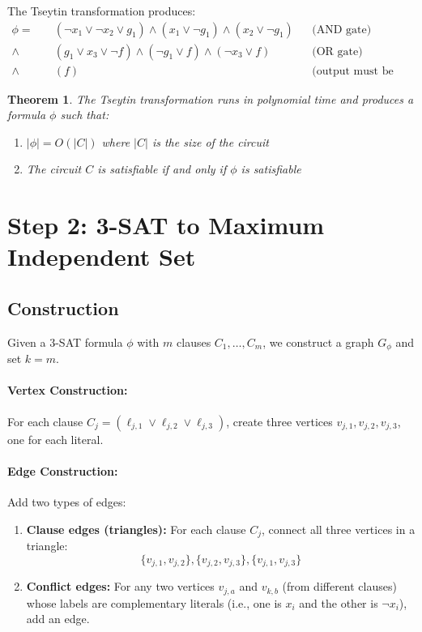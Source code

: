 \documentclass[11pt,a4paper]{article}
\newtheorem{theorem}{Theorem}
\begin{document}
The Tseytin transformation produces:
\begin{align*}
\phi = \quad & (\neg x_1 \lor \neg x_2 \lor g_1) \land (x_1 \lor \neg g_1) \land (x_2 \lor \neg g_1) && \text{(AND gate)} \\
\land\quad & (g_1 \lor x_3 \lor \neg f) \land (\neg g_1 \lor f) \land (\neg x_3 \lor f) && \text{(OR gate)} \\
\land\quad & (f) && \text{(output must be TRUE)}
\end{align*}

\begin{theorem}
The Tseytin transformation runs in polynomial time and produces a formula $\phi$ such that:
\begin{enumerate}
    \item $|\phi| = O(|C|)$ where $|C|$ is the size of the circuit
    \item The circuit $C$ is satisfiable if and only if $\phi$ is satisfiable
\end{enumerate}
\end{theorem}

\section{Step 2: 3-SAT to Maximum Independent Set}

\subsection{Construction}

Given a 3-SAT formula $\phi$ with $m$ clauses $C_1, \ldots, C_m$, we construct a graph $G_\phi$ and set $k = m$.

\paragraph{Vertex Construction:} For each clause $C_j = (\ell_{j,1} \lor \ell_{j,2} \lor \ell_{j,3})$, create three vertices $v_{j,1}, v_{j,2}, v_{j,3}$, one for each literal.

\paragraph{Edge Construction:} Add two types of edges:
\begin{enumerate}
    \item \textbf{Clause edges (triangles):} For each clause $C_j$, connect all three vertices in a triangle:
    \[
    \{v_{j,1}, v_{j,2}\}, \{v_{j,2}, v_{j,3}\}, \{v_{j,1}, v_{j,3}\}
    \]
    \item \textbf{Conflict edges:} For any two vertices $v_{j,a}$ and $v_{k,b}$ (from different clauses) whose labels are complementary literals (i.e., one is $x_i$ and the other is $\neg x_i$), add an edge.
\end{enumerate}
\end{document}
